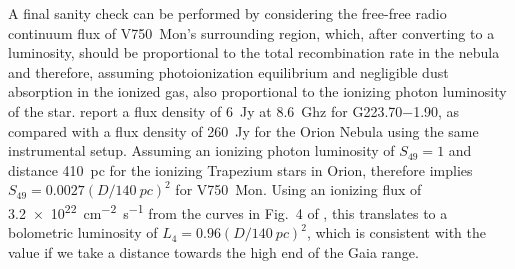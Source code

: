 \documentclass[useAMS, usenatbib, a4paper]{mnras}
\begin{document}
A final sanity check can be performed by considering the free-free
radio continuum flux of V750~Mon's surrounding \hii{} region, which,
after converting to a luminosity, should be proportional to the total
recombination rate in the nebula and therefore, assuming
photoionization equilibrium and negligible dust absorption in the
ionized gas, also proportional to the ionizing photon luminosity of
the star.  \citet{Quireza:2006b} report a flux density of \SI{6}{Jy}
at \SI{8.6}{Ghz} for G\num{223.70}\num{-1.90}, as compared with a flux
density of \SI{260}{Jy} for the Orion Nebula using the same
instrumental setup.  Assuming an ionizing photon luminosity of
\(S_{49} = 1\) and distance \SI{410}{pc} for the ionizing Trapezium
stars in Orion, therefore implies
\(S_{49} = 0.0027 (D/\SI{140}{pc})^2\) for V750~Mon.  Using an
ionizing flux of \SI{3.2e22}{cm^{-2}.s^{-1}} from the curves in Fig.~4
of \citet{Sternberg:2003a}, this translates to a bolometric luminosity
of \(L_4 = 0.96 (D/\SI{140}{pc})^2\), which is consistent with the
\citet{Fairlamb:2015a} value if we take a distance towards the high
end of the Gaia range.










\bsp	%
\label{lastpage}
\end{document}
